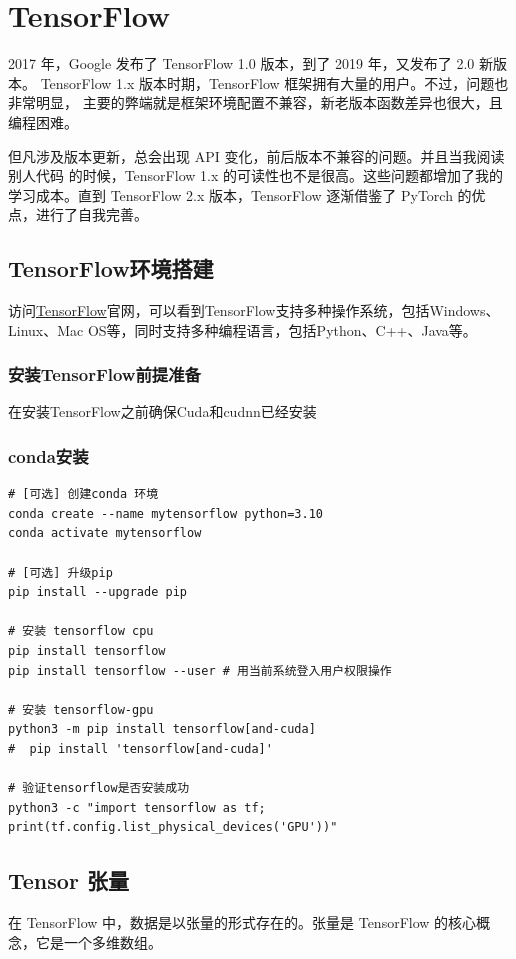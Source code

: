 \chapter{TensorFlow}

2017 年，Google 发布了 TensorFlow 1.0 版本，到了 2019 年，又发布了 2.0 新版本。
TensorFlow 1.x 版本时期，TensorFlow 框架拥有大量的用户。不过，问题也非常明显，
主要的弊端就是框架环境配置不兼容，新老版本函数差异也很大，且编程困难。

但凡涉及版本更新，总会出现 API 变化，前后版本不兼容的问题。并且当我阅读别人代码
的时候，TensorFlow 1.x 的可读性也不是很高。这些问题都增加了我的学习成本。直到
TensorFlow 2.x 版本，TensorFlow 逐渐借鉴了 PyTorch 的优点，进行了自我完善。

\section{TensorFlow环境搭建}
访问\href{https://www.tensorflow.org/?hl=zh-cn}{TensorFlow}官网，可以看到TensorFlow支持多种操作系统，包括Windows、Linux、Mac OS等，同时支持多种编程语言，包括Python、C++、Java等。

\subsection{安装TensorFlow前提准备}
在安装TensorFlow之前确保Cuda和cudnn已经安装

\subsection{conda安装}
\begin{lstlisting}[style=demostyle,numbers=none]
# [可选] 创建conda 环境    
conda create --name mytensorflow python=3.10
conda activate mytensorflow

# [可选] 升级pip
pip install --upgrade pip

# 安装 tensorflow cpu
pip install tensorflow
pip install tensorflow --user # 用当前系统登入用户权限操作

# 安装 tensorflow-gpu
python3 -m pip install tensorflow[and-cuda]
#  pip install 'tensorflow[and-cuda]'

# 验证tensorflow是否安装成功
python3 -c "import tensorflow as tf; print(tf.config.list_physical_devices('GPU'))"
\end{lstlisting}

\section{Tensor 张量}
在 TensorFlow 中，数据是以张量的形式存在的。张量是 TensorFlow 的核心概念，它是一个多维数组。

